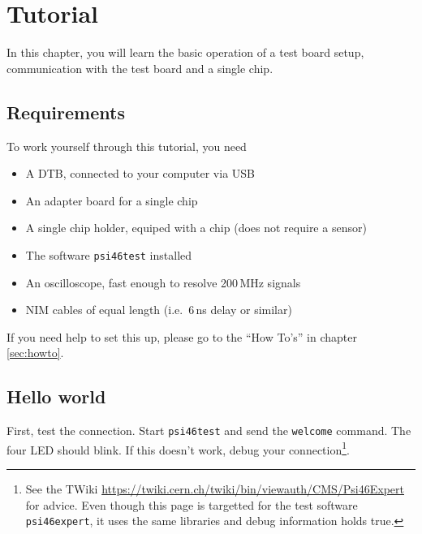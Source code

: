 \chapter{Tutorial}
In this chapter, you will learn the basic operation of a test board setup, communication with the test board and a single chip.

\section{Requirements}
To work yourself through this tutorial, you need
\begin{itemize}
    \item A DTB, connected to your computer via USB
    \item An adapter board for a single chip
    \item A single chip holder, equiped with a chip (does not require a sensor)
    \item The software \texttt{psi46test} installed
    \item An oscilloscope, fast enough to resolve 200\,MHz signals
    \item NIM cables of equal length (i.e.\, 6\,ns delay or similar)
\end{itemize}


If you need help to set this up, please go to the \enquote{How To's} in chapter \ref{sec:howto}.


\section{Hello world}

First, test the connection. Start \texttt{psi46test} and send the \texttt{welcome} command. The four LED should blink. If this doesn't work, debug your connection\footnote{See the TWiki \url{https://twiki.cern.ch/twiki/bin/viewauth/CMS/Psi46Expert} for advice. Even though this page is targetted for the test software \texttt{psi46expert}, it uses the same libraries and debug information holds true.}.

